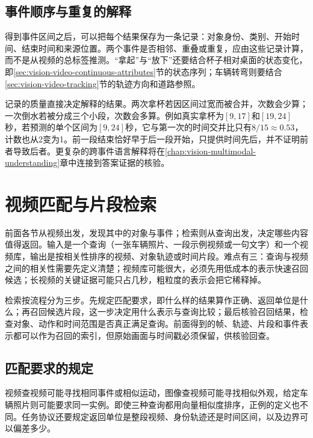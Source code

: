 \subsection{事件顺序与重复的解释}
\label{sec:vision-video-event-relations}

得到事件区间之后，可以把每个结果保存为一条记录：对象身份、类别、开始时间、结束时间和来源位置。两个事件是否相邻、重叠或重复，应由这些记录计算，而不是从视频的总标签推测。“拿起”与“放下”还要结合杯子相对桌面的状态变化，即\ref{sec:vision-video-continuous-attributes}节的状态序列；车辆转弯则要结合\ref{sec:vision-video-tracking}节的轨迹方向和道路参照。

记录的质量直接决定解释的结果。两次拿杯若因区间过宽而被合并，次数会少算；一次倒水若被分成三个小段，次数会多算。例如真实拿杯为$[9,17]$和$[19,24]$秒，若预测的单个区间为$[9,24]$秒，它与第一次的时间交并比只有$8/15\approx0.53$，计数也从2变为1。前一段结束恰好早于后一段开始，只提供时间先后，并不证明前者导致后者。更复杂的跨事件语言解释将在\ref{chap:vision-multimodal-understanding}章中连接到答案证据的核验。

\section{视频匹配与片段检索}
\label{sec:vision-video-retrieval}

前面各节从视频出发，发现其中的对象与事件；检索则从查询出发，决定哪些内容值得返回。输入是一个查询（一张车辆照片、一段示例视频或一句文字）和一个视频库，输出是按相关性排序的视频、对象轨迹或时间片段。难点有三：查询与视频之间的相关性需要先定义清楚；视频库可能很大，必须先用低成本的表示快速召回候选；长视频的关键证据可能只占几秒，粗粒度的表示会把它稀释掉。

检索按流程分为三步。先规定匹配要求，即什么样的结果算作正确、返回单位是什么；再召回候选片段，这一步决定用什么表示与查询比较；最后核验召回结果，检查对象、动作和时间范围是否真正满足查询。前面得到的帧、轨迹、片段和事件表示都可以作为召回的索引，但原始画面与时间戳必须保留，供核验回查。

\subsection{匹配要求的规定}
\label{sec:vision-video-query}

视频查视频可能寻找相同事件或相似运动，图像查视频可能寻找相似外观，给定车辆照片则可能要求同一实例。即使三种查询都用向量相似度排序，正例的定义也不同。任务协议还要规定返回单位是整段视频、身份轨迹还是时间区间，以及边界可以偏差多少。

